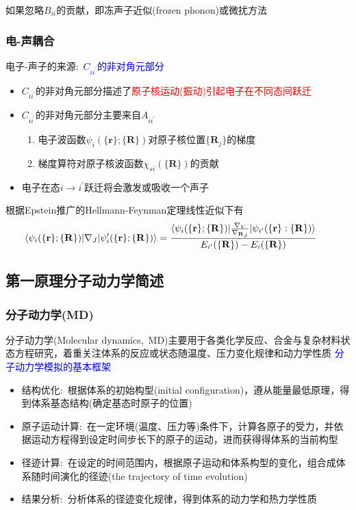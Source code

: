 {{如果忽略$B_{ii}$的贡献，即冻声子近似(\textrm{frozen phonon})或微扰方法
}

\frame
{
	\frametitle{电-声耦合}
	电子-声子的来源:~\textcolor{blue}{$C_{ii^{\prime}}$的非对角元部分}
	\begin{itemize}
		\item $C_{ii^{\prime}}$的非对角元部分描述了\textcolor{red}{原子核运动(振动)引起电子在不同态间跃迁}
		\item $C_{ii^{\prime}}$的非对角元部分主要来自$A_{ii^{\prime}}$
			\begin{enumerate}
\setlength{\itemsep}{7pt}
				\item 电子波函数$\psi_i(\{\mathbf{r}\};\{\mathbf{R}\})$对原子核位置$\{\mathbf{R}_j\}$的梯度
				\item 梯度算符对原子核波函数$\chi_{si}(\{\mathbf{R}\})$的贡献
			\end{enumerate}
		\item 电子在态$i\rightarrow i^{\prime}$跃迁将会激发或吸收一个声子
	\end{itemize}
	根据\textrm{Epstein}推广的\textrm{Hellmann-Feynman}定理线性近似下有
	\begin{displaymath}
		\hspace*{-15pt}
		\langle\psi_i(\{\mathbf{r}\};\{\mathbf{R}\})|\nabla_J|\psi_i^{\prime}(\{\mathbf{r}\};\{\mathbf{R}\})\rangle=\frac{\langle\psi_i(\{\mathbf{r}\};\{\mathbf{R}\})|\tfrac{\nabla_V}{\nabla_{\mathbf{R}_J}}|\psi_{i^{\prime}}(\{\mathbf{r}\}:\{\mathbf{R}\})\rangle}{E_{i^{\prime}}(\{\mathbf{R}\})-E_i(\{\mathbf{R}\})}
	\end{displaymath}
}

\subsection{第一原理分子动力学简述}
\frame
{
	\frametitle{分子动力学\textrm{(MD)}}
	分子动力学\textrm{(Molecular dynamics,~MD)}主要用于各类化学反应、合金与复杂材料状态方程研究，着重关注体系的反应或状态随温度、压力变化规律和动力学性质
\vskip 5pt
\textcolor{blue}{分子动力学模拟的基本框架}
	\begin{itemize}
		\item 结构优化:~根据体系的初始构型\textrm{(initial configuration)}，遵从能量最低原理，得到体系基态结构(确定基态时原子的位置)
		\item 原子运动计算:~在一定环境(温度、压力等)条件下，计算各原子的受力，并依据运动方程得到设定时间步长下的原子的运动，进而获得得体系的当前构型
		\item 径迹计算:~在设定的时间范围内，根据原子运动和体系构型的变化，组合成体系随时间演化的径迹\textrm{(the trajectory of time evolution)}
		\item 结果分析:~分析体系的径迹变化规律，得到体系的动力学和热力学性质
	\end{itemize}
}

}
